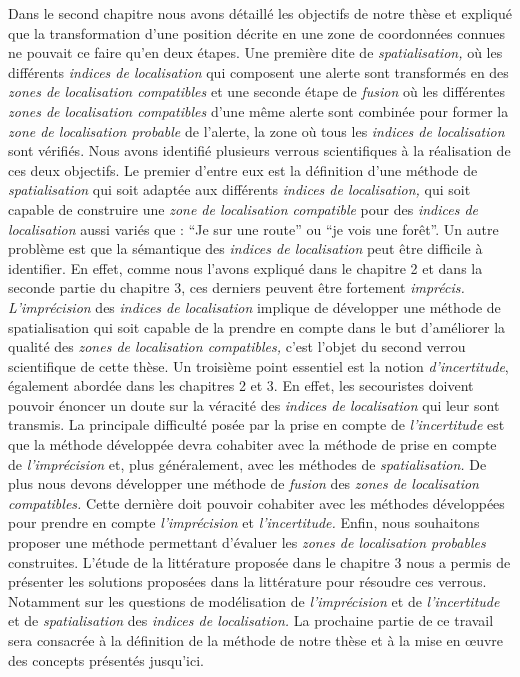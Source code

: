 Dans le second chapitre nous avons détaillé les objectifs de notre
thèse et expliqué que la transformation d'une position décrite en une
zone de coordonnées connues ne pouvait ce faire qu'en deux étapes. Une
première dite de \emph{spatialisation,} où les différents
\emph{indices de localisation} qui composent une alerte sont
transformés en des \emph{zones de localisation compatibles} et une
seconde étape de \emph{fusion} où les différentes \emph{zones de
  localisation compatibles} d'une même alerte sont combinée pour
former la \emph{zone de localisation probable} de l'alerte, \ie la
zone où tous les \emph{indices de localisation} sont vérifiés. Nous
avons identifié plusieurs verrous scientifiques à la réalisation de
ces deux objectifs. Le premier d'entre eux est la définition d'une
méthode de \emph{spatialisation} qui soit adaptée aux différents
\emph{indices de localisation,} \ie qui soit capable de construire une
\emph{zone de localisation compatible} pour des \emph{indices de
  localisation} aussi variés que : \enquote{Je sur une route} ou
\enquote{je vois une forêt}.  Un autre problème est que la sémantique
des \emph{indices de localisation} peut être difficile à
identifier. En effet, comme nous l'avons expliqué dans le chapitre 2
et dans la seconde partie du chapitre 3, ces derniers peuvent être
fortement \emph{imprécis.}  \emph{L'imprécision} des \emph{indices de
  localisation} implique de développer une méthode de spatialisation
qui soit capable de la prendre en compte dans le but d'améliorer la
qualité des \emph{zones de localisation compatibles,} c'est l'objet du
second verrou scientifique de cette thèse.  Un troisième point
essentiel est la notion \emph{d'incertitude}, également abordée dans
les chapitres 2 et 3. En effet, les secouristes doivent pouvoir
énoncer un doute sur la véracité des \emph{indices de localisation}
qui leur sont transmis. La principale difficulté posée par la prise en
compte de \emph{l'incertitude} est que la méthode développée devra
cohabiter avec la méthode de prise en compte de \emph{l'imprécision}
et, plus généralement, avec les méthodes de \emph{spatialisation.}  De
plus nous devons développer une méthode de \emph{fusion} des
\emph{zones de localisation compatibles.} Cette dernière doit pouvoir
cohabiter avec les méthodes développées pour prendre en compte
\emph{l'imprécision} et \emph{l'incertitude.} Enfin, nous souhaitons
proposer une méthode permettant d'évaluer les \emph{zones de
  localisation probables} construites. L'étude de la littérature
proposée dans le chapitre 3 nous a permis de présenter les solutions
proposées dans la littérature pour résoudre ces verrous. Notamment sur
les questions de modélisation de \emph{l'imprécision} et de
\emph{l'incertitude} et de \emph{spatialisation} des \emph{indices de
  localisation.} La prochaine partie de ce travail sera consacrée à la
définition de la méthode de notre thèse et à la mise en œuvre des
concepts présentés jusqu'ici.

